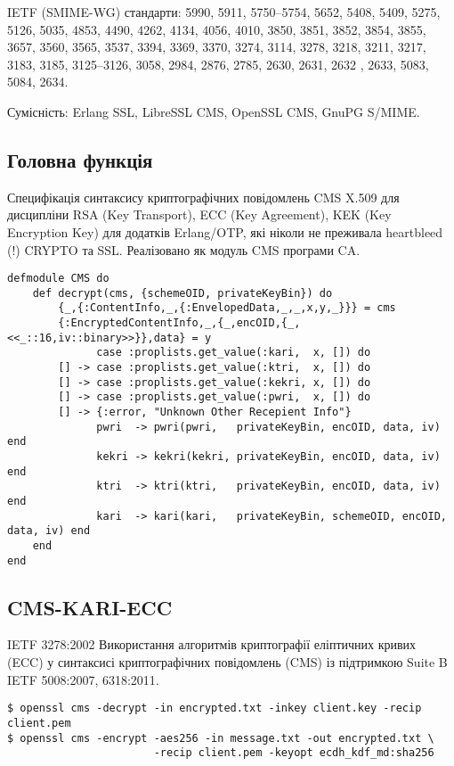 IETF (SMIME-WG) стандарти: 5990, 5911, 5750--5754, 5652, 5408, 5409,
5275, 5126, 5035, 4853, 4490, 4262, 4134, 4056, 4010, 3850, 3851,
3852, 3854, 3855, 3657, 3560, 3565, 3537, 3394, 3369, 3370, 3274,
3114, 3278, 3218, 3211, 3217, 3183, 3185, 3125--3126, 3058, 2984,
2876, 2785, 2630, 2631, 2632 , 2633, 5083, 5084, 2634.

Сумісність: Erlang SSL, LibreSSL CMS, OpenSSL CMS, GnuPG S/MIME.

\subsection{Головна функція}

Специфікація синтаксису криптографічних повідомлень CMS X.509 для
дисципліни RSA (Key Transport), ECC (Key Agreement), KEK (Key Encryption Key)
для додатків Erlang/OTP, які ніколи не преживала heartbleed (!) CRYPTO та SSL.
Реалізовано як модуль CMS програми CA.

\renewcommand{\footnotesize}{\scriptsize}

\begin{lstlisting}
defmodule CMS do
    def decrypt(cms, {schemeOID, privateKeyBin}) do
        {_,{:ContentInfo,_,{:EnvelopedData,_,_,x,y,_}}} = cms
        {:EncryptedContentInfo,_,{_,encOID,{_,<<_::16,iv::binary>>}},data} = y
              case :proplists.get_value(:kari,  x, []) do
        [] -> case :proplists.get_value(:ktri,  x, []) do
        [] -> case :proplists.get_value(:kekri, x, []) do
        [] -> case :proplists.get_value(:pwri,  x, []) do
        [] -> {:error, "Unknown Other Recepient Info"}
              pwri  -> pwri(pwri,   privateKeyBin, encOID, data, iv) end
              kekri -> kekri(kekri, privateKeyBin, encOID, data, iv) end
              ktri  -> ktri(ktri,   privateKeyBin, encOID, data, iv) end
              kari  -> kari(kari,   privateKeyBin, schemeOID, encOID, data, iv) end
    end
end
\end{lstlisting}

\newpage
\subsection{CMS-KARI-ECC}

IETF 3278:2002 Використання алгоритмів криптографії еліптичних
кривих (ECC) у синтаксисі криптографічних повідомлень (CMS) із
підтримкою Suite B IETF 5008:2007, 6318:2011.

\begin{lstlisting}
$ openssl cms -decrypt -in encrypted.txt -inkey client.key -recip client.pem
$ openssl cms -encrypt -aes256 -in message.txt -out encrypted.txt \
                       -recip client.pem -keyopt ecdh_kdf_md:sha256
\end{lstlisting}


